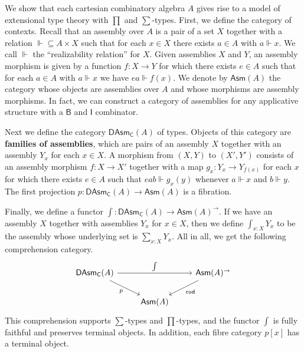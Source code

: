 \documentclass[a4paper,UKenglish,cleveref,numberwithinsect, autoref, thm-restate]{lipics-v2021}
\newcommand{\B}{\mathsf{B}}
\newcommand{\I}{\mathsf{I}}
\newcommand{\Arrow}[1]{#1^{\rightarrow}}
\newcommand{\cod}{\mathsf{cod}}
\newcommand{\fiber}[2]{#1[#2]}
\newcommand{\Asm}[1]{\mathsf{Asm}(#1)}
\newcommand{\DAsm}[1]{\mathsf{DAsm}_{\mathsf{C}}(#1)}
\newcommand{\DAsmPr}{p}
\newcommand{\total}{\int}
\newcommand{\realize}{\Vdash}
\begin{document}
\begin{example}
\label{exa:assembly-comp-cat}
We show that each cartesian combinatory algebra $A$ gives rise to a model of extensional type theory with $\prod$ and $\sum$-types.
First, we define the category of contexts.
Recall that an assembly over $A$ is a pair of a set $X$ together with a relation ${\realize } \subseteq A \times X$ such that for each $x \in X$ there exists $a \in A$ with $a \realize x$.
We call $\realize$ the ``realizability relation'' for $X$.
Given assemblies $X$ and $Y$,
an assembly morphism is given by a function $f : X \rightarrow Y$
for which there exists $e\in A$ such that for each $a\in A$ with $a \realize x$
we have $e a \realize f(x)$.
We denote by $\Asm{A}$
the category whose objects are assemblies over $A$
and whose morphisms are assembly morphisms.
In fact, we can construct a category of assemblies for any applicative structure with a $\B$ and $\I$ combinator.

Next we define the category $\DAsm{A}$ of types.
Objects of this category are \textbf{families of assemblies},
which are pairs of an assembly $X$
together with an assembly $Y_x$ for each $x \in X$.
A morphism from $(X, Y)$ to $(X', Y')$
consists of an assembly morphism $f : X \rightarrow X'$
together with a map $g_x : Y_x \rightarrow Y_{f(x)}$ for each $x$
for which there exists $e \in A$
such that $e a b \realize g_x(y)$ whenever $a \realize x$ and $b \realize y$.
The first projection $\DAsmPr : \DAsm{A} \rightarrow \Asm{A}$ is a fibration.

Finally, we define a functor $\total : \DAsm{A} \rightarrow \Arrow{\Asm{A}}$.
If we have an assembly $X$ together with assemblies $Y_x$ for $x \in X$,
then we define $\total_{x : X} Y_x$ to be the assembly whose underlying set is $\sum_{x : X} Y_x$.
All in all, we get the following comprehension category.
\[
\begin{tikzcd}
	{\DAsm{A}} && {\Arrow{\Asm{A}}} \\
	& {\Asm{A}}
	\arrow["\total", from=1-1, to=1-3]
	\arrow["\DAsmPr"', from=1-1, to=2-2]
	\arrow["\cod", from=1-3, to=2-2]
\end{tikzcd}
\]
This comprehension supports $\sum$-types and $\prod$-types,
and the functor $\total$ is fully faithful and preserves terminal objects.
In addition,
each fibre category $\fiber{\DAsmPr}{x}$ has a terminal object.
\end{example}
\end{document}
